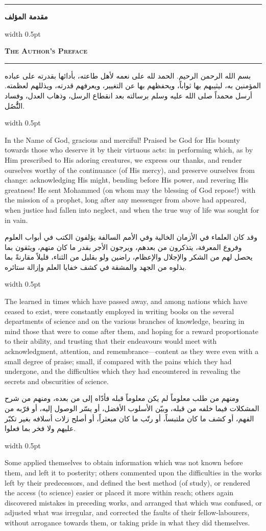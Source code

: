 \documentclass[10pt,a4paper]{book}
\newlength{\colwidth}
\newcommand{\bilingualpair}[2]{%
  \noindent
  \begin{minipage}[t]{\colwidth}
  \begin{flushright}
  \vspace{0pt}
  {\arabicfont\small #1}
  \end{flushright}
  \end{minipage}%
  \hfill\textcolor{columnsepclr}{\vrule width 0.5pt}\hfill
  \begin{minipage}[t]{\colwidth}
  \vspace{0pt}
  {\small #2}
  \end{minipage}%
  \par\vspace{0.6em}
}
\newcommand{\bilingualsectionheader}[2]{%
  \par\vspace{0.8em}
  \noindent
  \begin{minipage}[t]{\colwidth}
  \begin{flushright}
  \textbf{\arabicfont #1}
  \end{flushright}
  \end{minipage}%
  \hfill\textcolor{columnsepclr}{\vrule width 0.5pt}\hfill
  \begin{minipage}[t]{\colwidth}
  \textbf{\textsc{#2}}
  \end{minipage}%
  \par\vspace{0.5em}
}
\begin{document}
\noindent\textcolor{columnsepclr}{\rule{\textwidth}{0.6pt}}\par\vspace{0.3em}
\bilingualsectionheader{مقدمة المؤلف}{The Author's Preface}
\noindent\textcolor{columnsepclr}{\rule{\textwidth}{0.6pt}}\par\vspace{0.5em}

\bilingualpair{
بسم الله الرحمن الرحيم. الحمد لله على نعمه لأهل طاعته، بأدائها
بقدرته على عباده المؤمنين به، ليثيبهم بها ثواباً، ويحفظهم بها
عن التغيير، ويعرفهم قدرته، ويذللهم لعظمته. أرسل محمداً صلى الله
عليه وسلم برسالته بعد انقطاع الرسل، وذهاب العدل، وفساد النُُّصُل.
}{
In the Name of God, gracious and merciful! Praised be God for His bounty
towards those who deserve it by their virtuous acts: in performing which, as by
Him prescribed to His adoring creatures, we express our thanks, and render
ourselves worthy of the continuance (of His mercy), and preserve ourselves from
change: acknowledging His might, bending before His power, and revering His
greatness! He sent Mohammed (on whom may the blessing of God repose!) with the
mission of a prophet, long after any messenger from above had appeared, when
justice had fallen into neglect, and when the true way of life was sought for
in vain.
}

\bilingualpair{
وقد كان العلماء في الأزمان الخالية وفي الأمم السالفة يؤلفون
الكتب في أبواب العلوم وفروع المعرفة، يتذكرون من بعدهم، ويرجون
الأجر بقدر ما كان منهم، ويثقون بما يحصل لهم من الشكر
والإجلال والإعظام، راضين ولو بقليل من الثناء، قليلاً مقارنةً
بما بذلوه من الجهد والمشقة في كشف خفايا العلم وإزالة
ستائره.
}{
The learned in times which have passed away, and among nations which have
ceased to exist, were constantly employed in writing books on the several
departments of science and on the various branches of knowledge, bearing in
mind those that were to come after them, and hoping for a reward proportionate
to their ability, and trusting that their endeavours would meet with
acknowledgment, attention, and remembrance---content as they were even with a
small degree of praise; small, if compared with the pains which they had
undergone, and the difficulties which they had encountered in revealing the
secrets and obscurities of science.
}

\bilingualpair{
ومنهم من طلب معلوماً لم يكن معلوماً قبله فأدّاه إلى من بعده،
ومنهم من شرح المشكلات فيما خلفه من قبله، وبيّن الأسلوب الأفضل،
أو يسّر الوصول إليه، أو قرّبه من الفهم، أو كشف ما كان ملتبساً،
أو رتّب ما كان مبعثراً، أو أصلح زلات أسلافه بغير تكبّر عليهم
ولا فخر بما فعلوا.
}{
Some applied themselves to obtain information which was not known before them,
and left it to posterity; others commented upon the difficulties in the works
left by their predecessors, and defined the best method (of study), or
rendered the access (to science) easier or placed it more within reach; others
again discovered mistakes in preceding works, and arranged that which was
confused, or adjusted what was irregular, and corrected the faults of their
fellow-labourers, without arrogance towards them, or taking pride in what they
did themselves.
}
\end{document}
